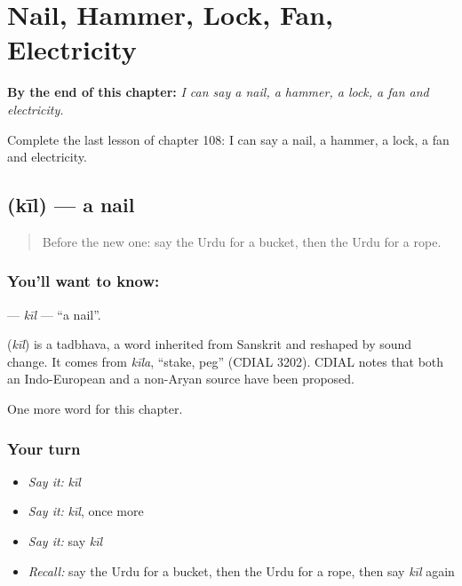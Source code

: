 
\chapter{Nail, Hammer, Lock, Fan, Electricity}
\label{ch:ur-nail-hammer-lock-fan-electricity}

\begin{chapteropening}
\textbf{By the end of this chapter:} \emph{I can say a nail, a hammer, a lock, a fan and electricity.}

Complete the last lesson of chapter 108: I can say a nail, a hammer, a lock, a fan and electricity.
\end{chapteropening}

\section[\texorpdfstring{\ur{کیل} (kīl)}{کیل (kīl)}]{ (kīl) — a nail}

\label{lesson:UR-C108-kil}



\begin{quote}
Before the new one: say the Urdu for a bucket, then the Urdu for a rope.
\end{quote}

\subsection*{You'll want to know: }
\textbf{} — \emph{kīl} — \textquotedblleft{}a nail\textquotedblright{}.

\begin{cousinweb}
\textbf{} (\emph{kīl}) is a tadbhava, a word inherited from Sanskrit and reshaped by sound change. It comes from \emph{kīla}, \textquotedblleft{}stake, peg\textquotedblright{} (CDIAL 3202). CDIAL notes that both an Indo-European and a non-Aryan source have been proposed.
\end{cousinweb}

\begin{grammarlens}[title={What you've built}]
One more word for this chapter.
\end{grammarlens}

\subsection*{Your turn}
\begin{itemize}
\raggedright
  \item \emph{Say it:} \emph{kīl}
  \item \emph{Say it:} \emph{kīl}, once more
  \item \emph{Say it:} say \emph{kīl}
  \item \emph{Recall:} say the Urdu for a bucket, then the Urdu for a rope, then say \emph{kīl} again
\end{itemize}

